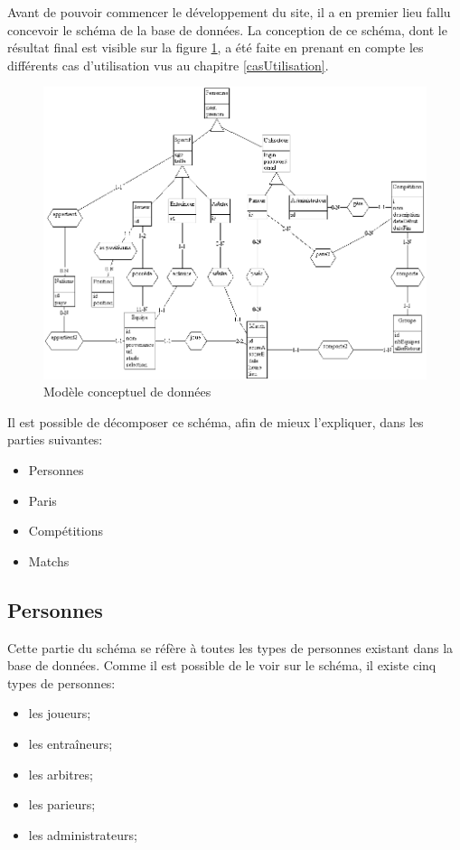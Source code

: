 \documentclass[10pt,a4paper,titlepage]{article}
\begin{document}
Avant de pouvoir commencer le développement du site, il a en premier lieu fallu concevoir le schéma de la base de données. La conception de ce schéma, dont le résultat final est visible sur la figure \ref{MDC}, a été faite en prenant en compte les différents cas d'utilisation vus au chapitre \ref{casUtilisation}.\\
\begin{figure}[!h]
	\begin{center}
			\includegraphics[width=12cm]{imgs/MDC.png}
			\caption{Modèle conceptuel de données}
			\label{MDC}
	\end{center}
\end{figure}

Il est possible de décomposer ce schéma, afin de mieux l'expliquer, dans les parties suivantes:
\begin{itemize}
	\item{Personnes}
	\item{Paris}
	\item{Compétitions}
	\item{Matchs}
\end{itemize}

\subsection{Personnes}
Cette partie du schéma se réfère à toutes les types de personnes existant dans la base de données. Comme il est possible de le voir sur le schéma, il existe cinq types de personnes:
\begin{itemize}
	\item{les joueurs;}
	\item{les entraîneurs;}
	\item{les arbitres;}
	\item{les parieurs;}
	\item{les administrateurs;\\}
\end{itemize}
\end{document}
